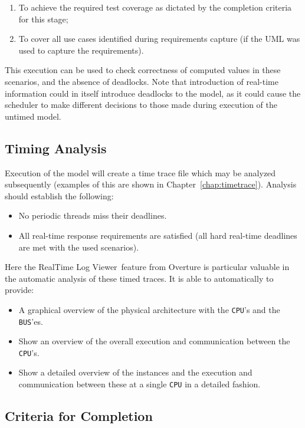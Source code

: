 \documentclass{overturerepchap}
\newcommand{\showtrace}{RealTime Log Viewer}
\begin{document}
\begin{enumerate}
\item To achieve the required test coverage as dictated by the
completion criteria for this stage;
\item To cover all use cases identified during requirements capture
(if the UML was used to capture the requirements).
\end{enumerate}

This execution can be used to check correctness of computed values in
these scenarios, and the absence of deadlocks. Note that introduction
of real-time information could in itself introduce deadlocks to the
model, as it could cause the scheduler to make different decisions to
those made during execution of the untimed model.

\subsection{Timing Analysis}

Execution of the model will create a time trace file which
may be analyzed subsequently (examples of this are shown in
Chapter~\ref{chap:timetrace}). Analysis should establish the
following:

\begin{itemize}
\item No periodic threads miss their deadlines.
\item All real-time response requirements are satisfied (all hard 
      real-time deadlines are met with the used scenarios).
\end{itemize}

Here the \showtrace\ feature from Overture is particular valuable 
in the automatic analysis of these timed traces. It is able to automatically
to provide:
\begin{itemize}
\item A graphical overview of the physical architecture with the \texttt{CPU}'s
      and the \texttt{BUS}'es.
\item Show an overview of the overall execution and communication between
      the \texttt{CPU}'s.
\item Show a detailed overview of the instances and the execution and 
      communication between these at a single \texttt{CPU} in a detailed
      fashion.
\end{itemize}

\subsection{Criteria for Completion}
\end{document}
